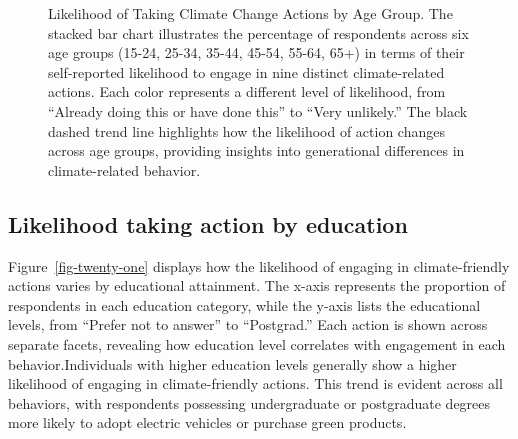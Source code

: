 \documentclass[
  letterpaper,
  DIV=11,
  numbers=noendperiod]{scrartcl}
\begin{document}
\begin{figure}


\caption{\label{fig-twenty}Likelihood of Taking Climate Change Actions
by Age Group. The stacked bar chart illustrates the percentage of
respondents across six age groups (15-24, 25-34, 35-44, 45-54, 55-64,
65+) in terms of their self-reported likelihood to engage in nine
distinct climate-related actions. Each color represents a different
level of likelihood, from ``Already doing this or have done this'' to
``Very unlikely.'' The black dashed trend line highlights how the
likelihood of action changes across age groups, providing insights into
generational differences in climate-related behavior.}

\end{figure}%

\subsection{Likelihood taking action by
education}\label{likelihood-taking-action-by-education}

Figure~\ref{fig-twenty-one} displays how the likelihood of engaging in
climate-friendly actions varies by educational attainment. The x-axis
represents the proportion of respondents in each education category,
while the y-axis lists the educational levels, from ``Prefer not to
answer'' to ``Postgrad.'' Each action is shown across separate facets,
revealing how education level correlates with engagement in each
behavior.Individuals with higher education levels generally show a
higher likelihood of engaging in climate-friendly actions. This trend is
evident across all behaviors, with respondents possessing undergraduate
or postgraduate degrees more likely to adopt electric vehicles or
purchase green products.
\end{document}
